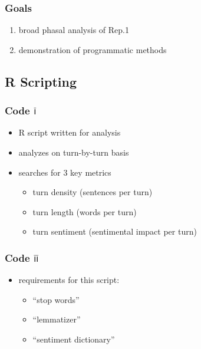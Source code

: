\documentclass{beamer}
\renewcommand{\Roman}[1]{$\overline{\textsf{\small{\MakeUppercase{\romannumeral #1}}}}$}
\begin{document}
\begin{frame}
\frametitle{Goals}
\begin{enumerate}
\item broad phasal analysis of Rep.1
\item demonstration of programmatic methods
\end{enumerate}
\vspace*{\fill}
\hspace*{\fill}
\hspace*{\fill}
\vspace*{\fill}
\end{frame}



\subsection{R Scripting} %

\begin{frame}
\frametitle{Code \Roman{1}}
\begin{itemize}
\item R script written for analysis
\item analyzes on turn-by-turn basis
\item searches for 3 key metrics
  \begin{itemize}
  \item turn density (sentences per turn)
  \item turn length (words per turn)
  \item turn sentiment (sentimental impact per turn)
  \end{itemize}
\end{itemize}
\end{frame}



\begin{frame}
\frametitle{Code \Roman{2}}
\begin{itemize}
\item requirements for this script:
  \begin{itemize}
  \item ``stop words''
  \item ``lemmatizer''
  \item ``sentiment dictionary''
  \end{itemize}
\end{itemize}
\end{frame}
\end{document}
